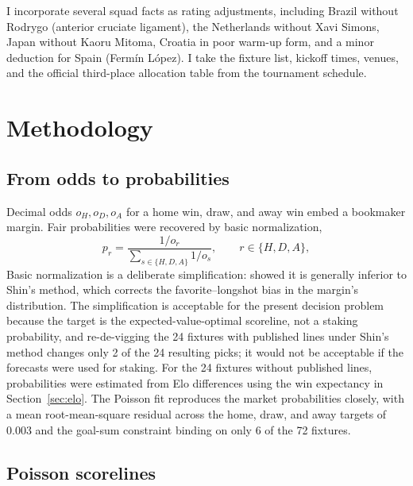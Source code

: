 \documentclass[11pt,letterpaper]{article}
\begin{document}
I incorporate several squad facts as rating adjustments, including Brazil without Rodrygo (anterior cruciate ligament), the Netherlands without Xavi Simons, Japan without Kaoru Mitoma, Croatia in poor warm-up form, and a minor deduction for Spain (Fermín López). I take the fixture list, kickoff times, venues, and the official third-place allocation table from the tournament schedule.

\section{Methodology}

\subsection{From odds to probabilities}

Decimal odds $o_H, o_D, o_A$ for a home win, draw, and away win embed a bookmaker margin. Fair probabilities were recovered by basic normalization,
\begin{equation}
p_r = \frac{1/o_r}{\sum_{s \in \{H,D,A\}} 1/o_s}, \qquad r \in \{H,D,A\},
\end{equation}
Basic normalization is a deliberate simplification: \citet{strumbelj2014} showed it is generally inferior to Shin's method, which corrects the favorite--longshot bias in the margin's distribution. The simplification is acceptable for the present decision problem because the target is the expected-value-optimal scoreline, not a staking probability, and re-de-vigging the 24 fixtures with published lines under Shin's method changes only 2 of the 24 resulting picks; it would not be acceptable if the forecasts were used for staking. For the 24 fixtures without published lines, probabilities were estimated from Elo differences using the win expectancy in Section~\ref{sec:elo}. The Poisson fit reproduces the market probabilities closely, with a mean root-mean-square residual across the home, draw, and away targets of 0.003 and the goal-sum constraint binding on only 6 of the 72 fixtures.

\subsection{Poisson scorelines}
\end{document}
